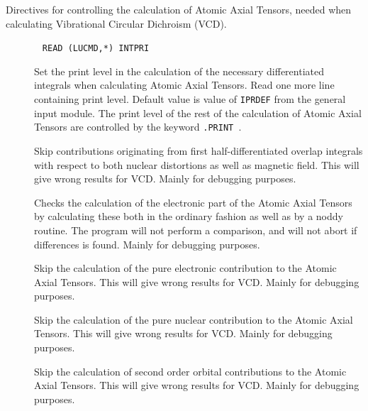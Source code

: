 Directives for controlling the calculation of Atomic Axial
Tensors,
needed when calculating Vibrational Circular Dichroism
(VCD).
\begin{description}

\item[]\verb| |\newline
\verb|READ (LUCMD,*) INTPRI|

Set the print level in the calculation of the necessary differentiated
integrals when calculating Atomic Axial Tensors. Read one more line
containing print level. Default value is value of \verb|IPRDEF|
from the general input module. The print level of the rest of the
calculation of Atomic Axial Tensors are controlled by the keyword
\verb|.PRINT |.

\item[] Skip contributions originating from first
half-differentiated overlap
integrals with respect to both nuclear
distortions as well as magnetic field. This will give wrong results
for VCD. Mainly for debugging purposes.

\item[] Checks the calculation of the electronic part of
the Atomic Axial Tensors by calculating these both in the ordinary
fashion as well as by a noddy routine. The program will not
perform a comparison, and will not abort if differences is found.
Mainly for debugging purposes.

\item[] Skip the calculation of the pure electronic
contribution to the Atomic Axial Tensors. This will give wrong results
for VCD. Mainly for debugging purposes.

\item[] Skip the calculation of the pure nuclear
contribution to the Atomic Axial Tensors. This will give wrong results
for VCD. Mainly for debugging purposes.

\item[] Skip the calculation of second order orbital
contributions to the Atomic Axial Tensors. This will give wrong
results for VCD. Mainly for debugging purposes.


\end{description}
